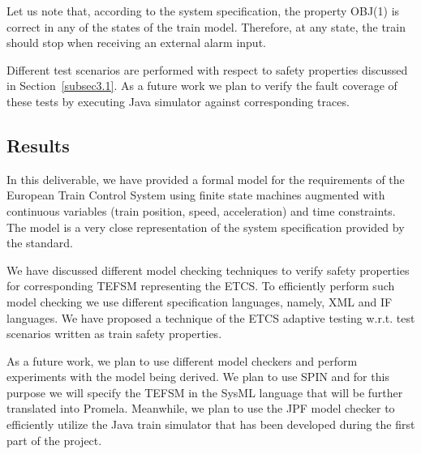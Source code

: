 \documentclass{template/openetcs_article}
\begin{document}
Let us note that, according to the system specification, the property OBJ(1) is correct in any of the states of the train model. Therefore, at any state, the train should stop when receiving an external alarm input.

Different test scenarios are performed with respect to safety properties discussed in Section~\ref{subsec3.1}. As a future work we plan to verify the fault coverage of these tests by executing Java simulator against corresponding traces.


\subsection*{Results}

In this deliverable, we have provided a formal model for the requirements of the European Train Control System using finite state machines augmented with continuous variables (train position, speed, acceleration) and time constraints. The model is a very close representation of the system specification provided by the standard.

We have discussed different model checking techniques to verify safety properties for corresponding TEFSM representing the ETCS. To efficiently perform such model checking we use different specification languages, namely, XML and IF languages.
%
We have proposed a technique of the ETCS adaptive testing w.r.t. test scenarios written as train safety properties. 

As a future work, we plan to use different model checkers and perform experiments with the model being derived. We plan to use SPIN and for this purpose we will specify the TEFSM in the SysML language that will be further translated into Promela. Meanwhile, we plan to use the JPF model checker to efficiently utilize the Java train simulator that has been developed during the first part of the project.




\nocite{*}

%



%
\end{document}
